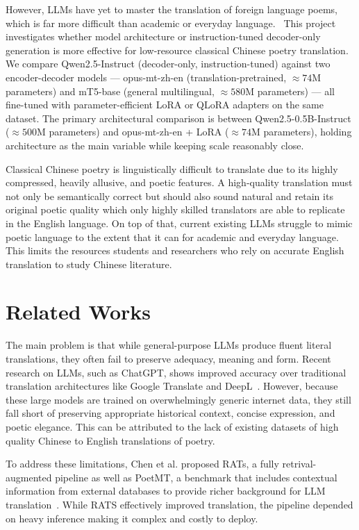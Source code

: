    However, LLMs have yet to master the translation of foreign language poems, which is far more difficult than academic or everyday language.~\cite{gao2010translation} This project investigates whether model architecture or instruction-tuned decoder-only generation is more effective for low-resource classical Chinese poetry translation. We compare Qwen2.5-Instruct (decoder-only, instruction-tuned) against two encoder-decoder models --- opus-mt-zh-en (translation-pretrained, $\approx74$M parameters) and mT5-base (general multilingual, $\approx580$M parameters) --- all fine-tuned with parameter-efficient LoRA or QLoRA adapters on the same dataset. The primary architectural comparison is between Qwen2.5-0.5B-Instruct ($\approx500$M parameters) and opus-mt-zh-en + LoRA ($\approx74$M parameters), holding architecture as the main variable while keeping scale reasonably close.

    Classical Chinese poetry is linguistically difficult to translate due to its highly compressed, heavily allusive, and poetic features. A high-quality translation must not only be semantically correct but should also sound natural and retain its original poetic quality which only highly skilled translators are able to replicate in the English language. On top of that, current existing LLMs struggle to mimic poetic language to the extent that it can for academic and everyday language. This limits the resources students and researchers who rely on accurate English translation to study Chinese literature.

\section{Related Works}
    The main problem is that while general-purpose LLMs produce fluent literal translations, they often fail to preserve adequacy, meaning and form. Recent research on LLMs, such as ChatGPT, shows improved accuracy over traditional translation architectures like Google Translate and DeepL~\cite{gao2024machine}. However, because these large models are trained on overwhelmingly generic internet data, they still fall short of preserving appropriate historical context, concise expression, and poetic elegance. This can be attributed to the lack of existing datasets of high quality Chinese to English translations of poetry.~\cite{chen2025benchmarking}

    To address these limitations, Chen et al. proposed RATs, a fully retrival-augmented pipeline as well as PoetMT, a benchmark that includes contextual information from external databases to provide richer background for LLM translation~\cite{chen2025benchmarking}. While RATS effectively improved translation, the pipeline depended on heavy inference making it complex and costly to deploy.

